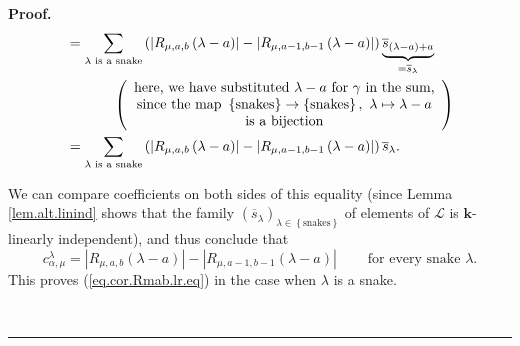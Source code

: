 \documentclass[numbers=enddot,12pt,final,onecolumn,notitlepage]{scrartcl}%
\theoremstyle{definition}
\newenvironment{proof}[1][Proof]{\noindent\textbf{#1.} }{\ \rule{0.5em}{0.5em}}
\let\sumnonlimits\sum
\renewcommand{\sum}{\sumnonlimits\limits}
\newenvironment{verlong}{}{}
\begin{document}
\begin{proof}
\begin{verlong}
\begin{align*}
&  =\sum_{\lambda\text{ is a snake}}\left(  \left\vert R_{\mu,a,b}\left(
\lambda-a\right)  \right\vert -\left\vert R_{\mu,a-1,b-1}\left(
\lambda-a\right)  \right\vert \right)  \underbrace{\overline{s}_{\left(
\lambda-a\right)  +a}}_{=\overline{s}_{\lambda}}\\
&  \ \ \ \ \ \ \ \ \ \ \left(
\begin{array}
[c]{c}%
\text{here, we have substituted }\lambda-a\text{ for }\gamma\text{ in the
sum,}\\
\text{since the map }\left\{  \text{snakes}\right\}  \rightarrow\left\{
\text{snakes}\right\}  ,\ \lambda\mapsto\lambda-a\\
\text{is a bijection}%
\end{array}
\right) \\
&  =\sum_{\lambda\text{ is a snake}}\left(  \left\vert R_{\mu,a,b}\left(
\lambda-a\right)  \right\vert -\left\vert R_{\mu,a-1,b-1}\left(
\lambda-a\right)  \right\vert \right)  \overline{s}_{\lambda}.
\end{align*}

\end{verlong}

\noindent We can compare coefficients on both sides of this equality (since
Lemma \ref{lem.alt.linind} shows that the family $\left(  \overline
{s}_{\lambda}\right)  _{\lambda\in\left\{  \text{snakes}\right\}  }$ of
elements of $\mathcal{L}$ is $\mathbf{k}$-linearly independent), and thus
conclude that%
\[
c_{\alpha,\mu}^{\lambda}=\left\vert R_{\mu,a,b}\left(  \lambda-a\right)
\right\vert -\left\vert R_{\mu,a-1,b-1}\left(  \lambda-a\right)  \right\vert
\ \ \ \ \ \ \ \ \ \ \text{for every snake }\lambda\text{.}%
\]
This proves (\ref{eq.cor.Rmab.lr.eq}) in the case when $\lambda$ is a snake.


\end{proof}
\end{document}
